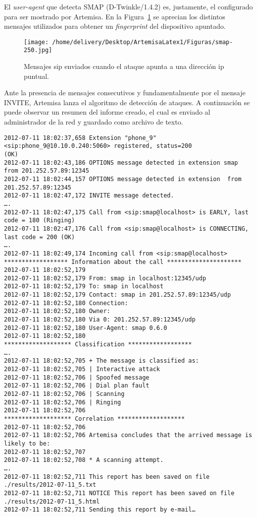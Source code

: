 \documentclass[a4paper,12pt]{report}
\newenvironment{myscriptlisting}
{\begin{list}{}{\setlength{\leftmargin}{1em}}\item\scriptsize\bfseries}
{\end{list}}
\begin{document}
El \emph{user-agent} que detecta SMAP (D-Twinkle/1.4.2) es, justamente, el 
configurado para ser mostrado por Artemisa.
En la Figura~\ref{ataque_dir_ip} se aprecian los distintos mensajes utilizados para obtener un 
\emph{fingerprint} del dispositivo apuntado.

\begin{figure}[h!] 
\centering
\texttt{[image: /home/delivery/Desktop/ArtemisaLatex1/Figuras/smap-250.jpg]}
\caption{Mensajes \ac{sip} enviados cuando el ataque apunta a una dirección \ac{ip} puntual.}
\label{ataque_dir_ip}
\end{figure}

Ante la presencia de mensajes consecutivos y fundamentalmente por el mensaje 
INVITE, Artemisa lanza el algoritmo de detección de ataques. 
A continuación se puede observar un resumen del informe creado, el cual es 
enviado al administrador de la red y guardado como archivo de texto.

\begin{myscriptlisting}
 \begin{verbatim}
2012-07-11 18:02:37,658 Extension "phone_9" <sip:phone_9@10.10.0.240:5060> registered, status=200
(OK)
2012-07-11 18:02:43,186 OPTIONS message detected in extension smap from 201.252.57.89:12345
2012-07-11 18:02:44,157 OPTIONS message detected in extension  from 201.252.57.89:12345
2012-07-11 18:02:47,172 INVITE message detected.
….
2012-07-11 18:02:47,175 Call from <sip:smap@localhost> is EARLY, last code = 180 (Ringing)
2012-07-11 18:02:47,176 Call from <sip:smap@localhost> is CONNECTING, last code = 200 (OK)
….
2012-07-11 18:02:49,174 Incoming call from <sip:smap@localhost>
****************** Information about the call *********************
2012-07-11 18:02:52,179 
2012-07-11 18:02:52,179 From: smap in localhost:12345/udp
2012-07-11 18:02:52,179 To: smap in localhost
2012-07-11 18:02:52,179 Contact: smap in 201.252.57.89:12345/udp
2012-07-11 18:02:52,180 Connection: 
2012-07-11 18:02:52,180 Owner: 
2012-07-11 18:02:52,180 Via 0: 201.252.57.89:12345/udp
2012-07-11 18:02:52,180 User-Agent: smap 0.6.0
2012-07-11 18:02:52,180 
******************* Classification ****************** 
….
2012-07-11 18:02:52,705 + The message is classified as:
2012-07-11 18:02:52,705 | Interactive attack
2012-07-11 18:02:52,706 | Spoofed message
2012-07-11 18:02:52,706 | Dial plan fault
2012-07-11 18:02:52,706 | Scanning
2012-07-11 18:02:52,706 | Ringing
2012-07-11 18:02:52,706 
******************* Correlation *******************
2012-07-11 18:02:52,706 
2012-07-11 18:02:52,706 Artemisa concludes that the arrived message is likely to be:
2012-07-11 18:02:52,707 
2012-07-11 18:02:52,708 * A scanning attempt.
….
2012-07-11 18:02:52,711 This report has been saved on file ./results/2012-07-11_5.txt
2012-07-11 18:02:52,711 NOTICE This report has been saved on file ./results/2012-07-11_5.html
2012-07-11 18:02:52,711 Sending this report by e-mail…

 \end{verbatim}
\end{myscriptlisting}
\end{document}
